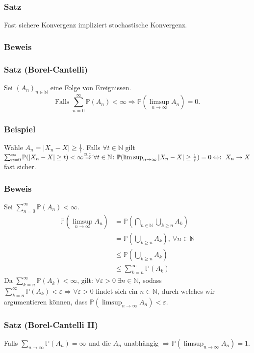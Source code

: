 \subsubsection{Satz}
Fast sichere Konvergenz impliziert stochastische Konvergenz.
\subsubsection{Beweis}
\weg
\subsubsection{Satz (Borel-Cantelli)}
Sei $(A_n)_{n\in\mathbb{N}}$ eine Folge von Ereignissen.
\[
\text{Falls }\sum_{n=0}^\infty\mathbb{P}(A_n)<\infty\Rightarrow\mathbb{P}(\limsup_{n\to\infty}A_n)=0.
\]
\subsubsection{Beispiel}
W\"ahle $A_n=|X_n-X|\geq\frac{1}{t}$. Falls $\forall t\in\mathbb{N}$ gilt $\sum_{n=0}^\infty\mathbb{P}(|X_n-X|\geq t)<\infty\textabove{B.C.}{\Rightarrow}\forall t\in\mathbb{N}\colon\mathbb{P}(\limsup_{n\to\infty}|X_n-X|\geq\frac{1}{t})=0\Leftrightarrow:\ X_n\to X$ fast sicher.
\subsubsection{Beweis}
Sei $\sum_{n=0}^\infty\mathbb{P}(A_n)<\infty$.
\begin{align*}
\mathbb{P}(\limsup_{n\to\infty}A_n)
&=\mathbb{P}(\bigcap_{n\in\mathbb{N}}\bigcup_{k\geq n}A_k)\\
&=\mathbb{P}(\bigcup_{k\geq n}A_k),\ \forall n\in\mathbb{N}\\
&\leq\mathbb{P}(\bigcup_{k\geq n}A_k)\\
&\leq\sum_{k=n}^\infty\mathbb{P}(A_k)
\end{align*}
Da $\sum_{k=n}^\infty\mathbb{P}(A_k)<\infty$, gilt: $\forall\varepsilon>0\ \exists n\in\mathbb{N}$, sodass $\sum_{k=n}^\infty\mathbb{P}(A_k)<\varepsilon\Rightarrow\forall\varepsilon>0$ findet sich ein $n\in\mathbb{N}$, durch welches wir argumentieren k\"onnen, dass $\mathbb{P}(\limsup_{n\to\infty}A_n)<\varepsilon$.
\subsubsection{Satz (Borel-Cantelli II)}
Falls $\sum_{n\to\infty}\mathbb{P}(A_n)=\infty$ und die $A_n$ unabh\"angig $\Rightarrow\mathbb{P}(\limsup_{n\to\infty}A_n)=1$.
